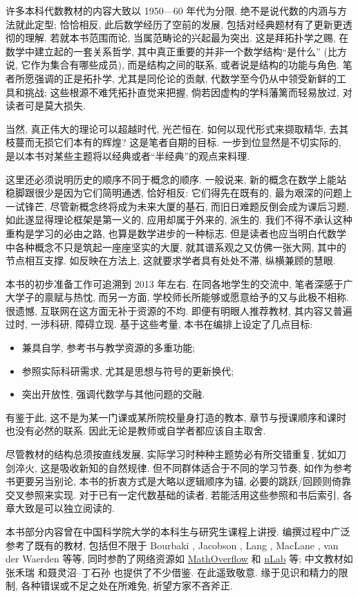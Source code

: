 许多本科代数教材的内容大致以 1950---60 年代为分限. 绝不是说代数的内涵与方法就此定型; 恰恰相反, 此后数学经历了空前的发展, 包括对经典题材有了更新更透彻的理解. 若就本书范围而论, 当属范畴论的兴起最为突出. 这是拜拓扑学之赐, 在数学中建立起的一套关系哲学, 其中真正重要的并非一个数学结构``是什么'' (比方说, 它作为集合有哪些成员), 而是结构之间的联系, 或者说是结构的功能与角色. 笔者所愿强调的正是拓扑学, 尤其是同伦论的贡献, 代数学至今仍从中领受新鲜的工具和挑战; 这些根源不难凭拓扑直觉来把握, 倘若因虚构的学科藩篱而轻易放过, 对读者可是莫大损失.

当然, 真正伟大的理论可以超越时代, 光芒恒在. 如何以现代形式来撷取精华, 去其枝蔓而无损它们本有的辉煌? 这是笔者自期的目标. 一步到位显然是不切实际的, 是以本书对某些主题将以经典或者``半经典''的观点来料理.

这里还必须说明历史的顺序不同于概念的顺序. 一般说来, 新的概念在数学上能站稳脚跟很少是因为它们简明通透, 恰好相反: 它们得先在既有的, 最为艰深的问题上一试锋芒, 尽管新概念终将成为未来大厦的基石, 而旧日难题反倒会成为课后习题, 如此遂显得理论框架是第一义的, 应用却属于外来的, 派生的. 我们不得不承认这种重构是学习的必由之路, 也算是数学进步的一种标志. 但是读者也应当明白代数学中各种概念不只是筑起一座座坚实的大厦, 就其谱系观之又仿佛一张大网, 其中的节点相互支撑. 如反映在方法上, 这就要求学者具有处处不滞, 纵横兼顾的慧眼.

本书的初步准备工作可追溯到 2013 年左右. 在同各地学生的交流中, 笔者深感于广大学子的禀赋与热忱, 而另一方面, 学校师长所能够或愿意给予的又与此极不相称. 很遗憾, 互联网在这方面无补于资源的不均. 即便有明眼人推荐教材, 其内容又普遍过时, 一涉科研, 障碍立现. 基于这些考量, 本书在编排上设定了几点目标:
\begin{itemize}
	\item 兼具自学, 参考书与教学资源的多重功能;
	\item 参照实际科研需求, 尤其是思想与符号的更新换代;
	\item 突出开放性, 强调代数学与其他问题的交融.
\end{itemize}
有鉴于此, 这不是为某一门课或某所院校量身打造的教本, 章节与授课顺序和课时也没有必然的联系. 因此无论是教师或自学者都应该自主取舍.

尽管教材的结构总须按直线发展, 实际学习时种种主题势必有所交错重复, 犹如刀剑淬火, 这是吸收新知的自然规律. 但不同群体适合于不同的学习节奏, 如作为参考书更要另当别论, 本书的折衷方式是大略以逻辑顺序为锚, 必要的跳跃/回顾则倚靠交叉参照来实现. 对于已有一定代数基础的读者, 若能活用这些参照和书后索引, 各章大致是可以独立阅读的.

本书部分内容曾在中国科学院大学的本科生与研究生课程上讲授. 编撰过程中广泛参考了既有的教材, 包括但不限于 Bourbaki \cite{Bou-Alg1, Bou-Alg2}, Jacobson \cite{Ja85, Ja89}, Lang \cite{Lang02}, MacLane \cite{ML98}, van der Waerden \cite{vdW1,vdW2} 等等, 同时参酌了网络资源如 \href{http://mathoverflow.net}{MathOverflow} 和 \href{http://ncatlab.org}{nLab} 等; 中文教材如张禾瑞 \cite{ZHR} 和聂灵沼--丁石孙 \cite{DN00} 也提供了不少借鉴. 在此遥致敬意. 缘于见识和精力的限制, 各种错误或不足之处在所难免, 祈望方家不吝斧正.

